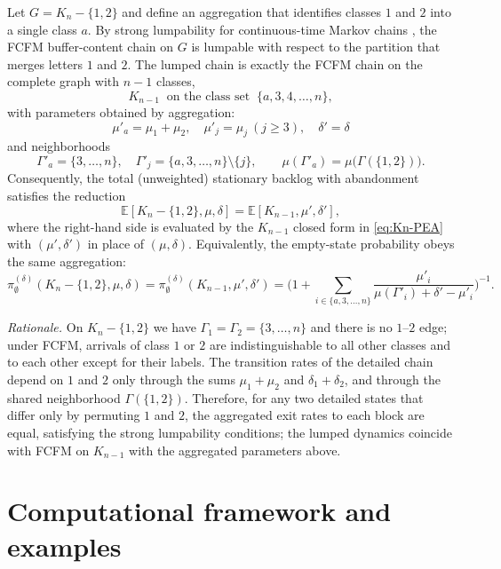 \documentclass[11pt]{article}
\begin{document}
{Let \(G=K_n-\{1,2\}\) and define an aggregation that identifies classes \(1\) and \(2\) into a single class \(a\).
By strong lumpability for continuous-time Markov chains \cite{BaYe93}, the \textsc{FCFM} buffer-content chain on \(G\) is lumpable with respect to the partition that merges letters \(1\) and \(2\).
The lumped chain is exactly the \textsc{FCFM} chain on the complete graph with \(n-1\) classes,
\[
K_{n-1}\ \text{ on the class set }\ \{a,3,4,\dots,n\},
\]
with parameters obtained by aggregation:
\[
\mu'_a=\mu_1+\mu_2,\quad \mu'_j=\mu_j\ (j\ge3),\quad \delta'=\delta
\]
and neighborhoods
\[
\Gamma'_a=\{3,\dots,n\},\quad \Gamma'_j=\{a,3,\dots,n\}\setminus\{j\},\qquad
\mu(\Gamma'_a)=\mu\!\bigl(\Gamma(\{1,2\})\bigr).
\]
Consequently, the total (unweighted) stationary backlog with abandonment satisfies the reduction
\begin{equation}\label{eq:lump-Kn12}
\mathbb{E}[K_n-\{1,2\},\mu,\delta]=\mathbb{E}[K_{n-1},\mu',\delta'],
\end{equation}
where the right-hand side is evaluated by the \(K_{n-1}\) closed form in \eqref{eq:Kn-PEA} with \((\mu',\delta')\) in place of \((\mu,\delta)\).
Equivalently, the empty-state probability obeys the same aggregation:
\begin{equation}\label{eq:lump-pi0}
\pi_{\emptyset}^{(\delta)}(K_n-\{1,2\},\mu,\delta)=
\pi_{\emptyset}^{(\delta)}(K_{n-1},\mu',\delta')=\Biggl(1+\sum_{i\in\{a,3,\dots,n\}}\frac{\mu'_i}{\mu(\Gamma'_i)+\delta'-\mu'_i}\Biggr)^{-1}.
\end{equation}

\noindent\emph{Rationale.}
On \(K_n-\{1,2\}\) we have \(\Gamma_1=\Gamma_2=\{3,\dots,n\}\) and there is no \(1\)–\(2\) edge; under \textsc{FCFM}, arrivals of class \(1\) or \(2\) are indistinguishable to all other classes and to each other except for their labels.
The transition rates of the detailed chain depend on \(1\) and \(2\) only through the sums \(\mu_1+\mu_2\) and \(\delta_1+\delta_2\), and through the shared neighborhood \(\Gamma(\{1,2\})\).
Therefore, for any two detailed states that differ only by permuting \(1\) and \(2\), the aggregated exit rates to each block are equal, satisfying the strong lumpability conditions; the lumped dynamics coincide with \textsc{FCFM} on \(K_{n-1}\) with the aggregated parameters above.

\section{Computational framework and examples}\label{sec:comp-maps}

}
\end{document}
